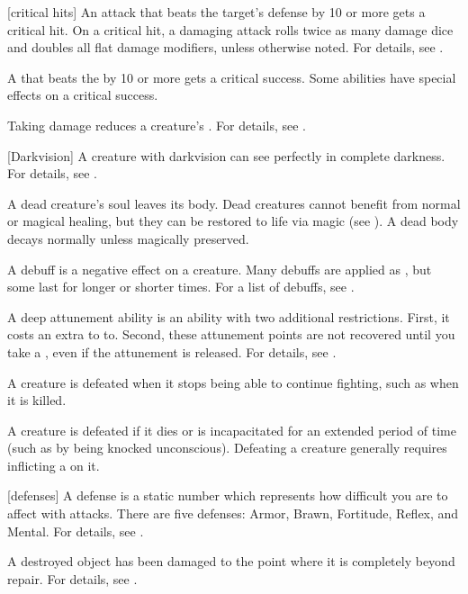 [critical hits] An attack that beats the target's defense by 10 or more gets a critical hit.
On a critical hit, a damaging attack rolls twice as many damage dice and doubles all flat damage modifiers, unless otherwise noted.
For details, see .

 A  that beats the  by 10 or more gets a critical success.
Some abilities have special effects on a critical success.

 Taking damage reduces a creature's .
For details, see .

[Darkvision] A creature with darkvision can see perfectly in complete darkness.
For details, see .

 A dead creature's soul leaves its body. Dead creatures cannot benefit from normal or magical healing, but they can be restored to life via magic (see ). A dead body decays normally unless magically preserved.

 A debuff is a negative effect on a creature.
Many debuffs are applied as , but some last for longer or shorter times.
For a list of debuffs, see .

 A deep attunement ability is an  ability with two additional restrictions.
First, it costs an extra  to  to.
Second, these attunement points are not recovered until you take a , even if the attunement is released.
For details, see .

 A creature is defeated when it stops being able to continue fighting, such as when it is killed.

 A creature is defeated if it dies or is incapacitated for an extended period of time (such as by being knocked unconscious).
Defeating a creature generally requires inflicting a  on it.

[defenses] A defense is a static number which represents how difficult you are to affect with attacks.
There are five defenses: Armor, Brawn, Fortitude, Reflex, and Mental.
For details, see .

 A destroyed object has been damaged to the point where it is completely beyond repair.
For details, see .

